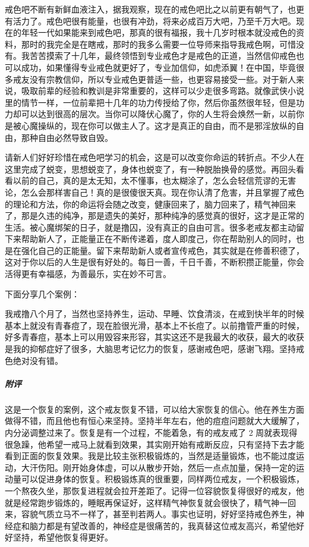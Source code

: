 戒色吧不断有新鲜血液注入，据我观察，现在的戒色吧比之以前更有朝气了，也更有活力了。戒色吧很有能量，也很有冲劲，将来必成百万大吧，乃至千万大吧。现在的年轻一代如果能来到戒色吧，那真的很有福报，我十几岁时根本就没戒色的资料，那时的我完全是在瞎戒，那时的我多么需要一位导师来指导我戒色啊，可惜没有。我苦苦摸索了十几年，最终领悟到专业戒色才是戒色的正道，当然信仰戒色也可以成功，如果懂得专业戒色就更好了，专业加信仰，如虎添翼！在中国，毕竟很多戒友没有宗教信仰，所以专业戒色更普适一些，也更容易接受一些。对于新人来说，吸取前辈的经验和教训是非常重要的，这样可以少走很多弯路。就像武侠小说里的情节一样，一位前辈把十几年的功力传授给了你，然后你虽然很年轻，但是功力却可以达到很高的层次。当你可以降伏心魔了，你的人生将会焕然一新，以前你是被心魔操纵的，现在你可以做主人了。这才是真正的自由，而不是邪淫放纵的自由，那种自由必然导致自毁。

请新人们好好珍惜在戒色吧学习的机会，这是可以改变你命运的转折点。不少人在这里完成了蜕变，思想蜕变了，身体也蜕变了，有一种脱胎换骨的感觉。再回头看看以前的自己，真的是太无知，太不懂事，也太糊涂了，怎么会轻信荒谬的无害论，怎么会那样害自己！真的是很傻很天真。现在你认清了危害，并且掌握了戒色的理论和方法，你的命运将会随之改变，健康回来了，脑力回来了，精气神回来了，那是久违的纯净，那是遗失的美好，那种纯净的感觉真的很好，这才是正常的生活。被心魔绑架的日子，就是撸囚，没有真正的自由可言。很多老戒友都主动留下来帮助新人了，正能量正在不断传递着，度人即度己，你在帮助别人的同时，也是在强化自己的正能量。留下来帮助新人或者宣传戒色，其实就是在修善积德了，这对于你以后的人生是很有好处的。每日一善，千日千善，不断积攒正能量，你会活得更有幸福感，为善最乐，实在妙不可言。

下面分享几个案例：

\begin{case}
    我戒撸八个月了，当然也坚持养生，运动、早睡、饮食清淡，在戒到快半年的时候基本上就没有青春痘了，现在脸很光滑，基本上不长痘了。以前撸管严重的时候，好多青春痘，基本上可以用毁容来形容，其实这还不是我最大的收获，最大的收获是我的抑郁症好了很多，大脑思考记忆力的恢复，感谢戒色吧，感谢飞翔。坚持戒色绝对没有错。
    \subparagraph{附评} 这是一个恢复的案例，这个戒友恢复不错，可以给大家恢复的信心。他在养生方面做得不错，而且他也有恒心来坚持。坚持半年左右，他的痘痘问题就大大缓解了，内分泌调整过来了。恢复是有一个过程，不能着急，有的戒友戒了 2 周就表现得很急躁，他希望一戒马上就看到效果，其实刚开始有戒断反应，只有坚持下去才能看到正面的恢复效果。我是比较主张积极锻炼的，当然是适量锻炼，也不能过度运动，大汗伤阳。刚开始身体虚，可以从散步开始，然后一点点加量，保持一定的运动量可以促进身体的恢复。积极锻炼真的很重要，同样两位戒友，一个积极锻炼，一个熬夜久坐，那恢复进程就会拉开差距了。记得一位容貌恢复得很好的戒友，他就是经常跑步锻炼的，睡眠再保证好，这样精气神恢复就会很快了，精气神一回来，容貌气质立马不一样了，甚至判若两人。事实也证明，好好坚持戒色养生，神经症和脑力都是有望改善的，神经症是很痛苦的，我真替这位戒友高兴，希望他好好坚持，希望他恢复得更好。
\end{case}

